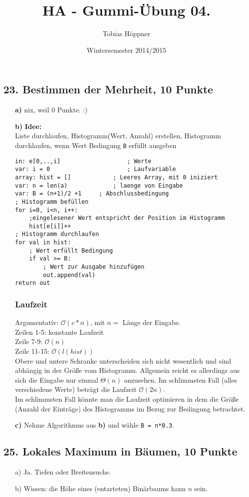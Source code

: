 \documentclass[ngerman,a4paper]{report}
\author{Tobias Höppner}
\title{HA - Gummi-Übung 04. }
\date{Wintersemester 2014/2015}
\renewcommand{\maketitle}{}
\begin{document}
 
\maketitle 

\subsection*{23. Bestimmen der Mehrheit, 10 Punkte}

\begin{enumerate}
\item[\textbf{a)}] nix, weil 0 Punkte. :)
\item[\textbf{b)}] \textbf{Idee:}\\
Liste durchlaufen, Histogramm(Wert, Anzahl) erstellen, Histogramm durchlaufen, wenn Wert Bedingung \lstinline!B! erfüllt ausgeben
\begin{lstlisting}
in: e[0,..,i]					; Werte
var: i = 0						; Laufvariable
array: hist = []			; Leeres Array, mit 0 iniziert
var: n = len(a) 			; laenge von Eingabe
var: B = (n+1)/2 +1		; Abschlussbedingung
; Histogramm befüllen
for i=0, i<n, i++:
	;eingelesener Wert entspricht der Position im Histogramm
	hist[e[i]]++
; Histogramm durchlaufen
for val in hist:
	; Wert erfüllt Bedingung
	if val >= B:
		; Wert zur Ausgabe hinzufügen
		out.append(val)
return out
\end{lstlisting}
\subsubsection*{Laufzeit}
Argumentativ: $\mathcal{O}(c*n)$, mit $n=$ Länge der Eingabe.\\
Zeilen 1-5: konstante Laufzeit\\
Zeile 7-9: $\mathcal{O}(n)$\\
Zeile 11-15: $\mathcal{O}(l(hist))$\\

Obere und untere Schranke unterscheiden sich nicht wesentlich und sind abhängig in der Größe vom Histogramm. Allgemein reicht es allerdings aus sich die Eingabe nur einmal $\Theta(n)$ anzusehen. Im schlimmsten Fall (alles verschiedene Werte) beträgt die Laufzeit $\mathcal{O}(2n)$.\\
Im schlimmsten Fall könnte man die Laufzeit optimieren in dem die Größe (Anzahl der Einträge) des Histogramms im Bezug zur Bedingung betrachtet.\\ 
\item[\textbf{c)}] Nehme Algorithmus aus \textbf{b)} und wähle \lstinline!B = n*0.3!.
\end{enumerate}

\subsection*{25. Lokales Maximum in Bäumen, 10 Punkte}
\begin{enumerate}
\item[a)] Ja. Tiefen oder Breitensuche.
\item[b)] Wissen: die Höhe eines (entarteten) Binärbaums kann $n$ sein.
\end{enumerate}
\end{document}
